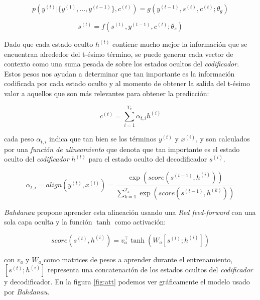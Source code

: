 \begin{equation}
    p(y^{(t)} | \{y^{(1)}, \dots , y^{(t-1)}\}, c^{(t)}) = g(y^{(t-1)}, s^{(t)}, c^{(t)}; \theta_g)
\end{equation}

\begin{equation}
    s^{(t)} = f(s^{(t)}, y^{(t-1)}, c^{(t)}; \theta_s)
\end{equation}

Dado que cada estado oculto $h^{(t)}$ contiene mucho mejor la información que se encuentran alrededor
del t-ésimo término, se puede generar cada vector de contexto como una suma pesada de sobre los
estados ocultos del \textit{codificador}. Estos pesos nos ayudan a determinar que tan importante es la
información codificada por cada estado oculto y al momento de obtener la salida del t-ésimo valor
 a aquellos que son más relevantes para obtener la predicción:

\begin{equation}
    c^{(t)} = \sum_{i=1}^{T_x} \alpha_{t,i} h^{(i)}
\end{equation}

cada peso $\alpha_{t,i}$ indica que tan bien se  los términos $y^{(t)}$ y $x^{(i)}$,
y son calculados por una \textit{función de alineamiento} que denota que tan importante es el estado
oculto del \textit{codificador} $h^{(t)}$ para el estado oculto del decodificador $s^{(i)}$.

\begin{equation}
    \alpha_{t,i} = align(y^{(t)}, x^{(i)}) = \frac{\exp(score(s^{(t-1)}, h^{(i)}))}{\sum_{k=1}^{T_x} \exp(score(s^{(t-1)}, h^{(k)}))}
    \label{eq:b_align}
\end{equation}

\textit{Bahdanau} propone aprender esta alineación usando una \textit{Red feed-forward} con una sola
capa oculta y la función $\tanh$ como activación:

\begin{equation}
    score(s^{(t)}, h^{(i)}) = v^\top_a \tanh(W_a[s^{(t)};h^{(i)}])
    \label{eq:concat}
\end{equation}

con $v_a$ y $W_a$ como matrices de pesos a aprender durante el entrenamiento, $[s^{(t)};h^{(i)}]$
representa una concatenación de los estados ocultos del \textit{codificador} y decodificador. En la figura
\ref{fig:att} podemos ver gráficamente el modelo usado por \textit{Bahdanau}.

